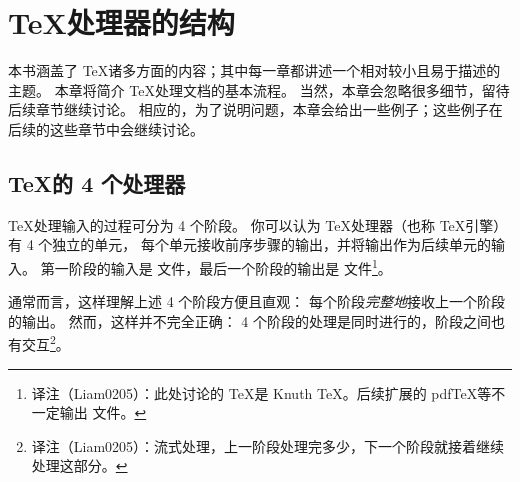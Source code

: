 \documentclass{book}
\begin{document}
\chapter{\TeX 处理器的结构}

本书涵盖了 \TeX 诸多方面的内容；其中每一章都讲述一个相对较小且易于描述的主题。
本章将简介 \TeX 处理文档的基本流程。
当然，本章会忽略很多细节，留待后续章节继续讨论。
相应的，为了说明问题，本章会给出一些例子；这些例子在后续的这些章节中会继续讨论。

\section{\TeX 的 4 个处理器}

\TeX 处理输入的过程可分为 4 个阶段。
你可以认为 \TeX 处理器（也称 \TeX 引擎）有 4 个独立的单元，
每个单元接收前序步骤的输出，并将输出作为后续单元的输入。
第一阶段的输入是  文件，最后一个阶段的输出是  文件\footnote{译注（Liam0205）：此处讨论的 \TeX 是 Knuth \TeX。后续扩展的 pdf\TeX 等不一定输出  文件。}。%

通常而言，这样理解上述 4 个阶段方便且直观：
每个阶段\emph{完整地}接收上一个阶段的输出。
然而，这样并不完全正确：
4 个阶段的处理是同时进行的，阶段之间也有交互\footnote{译注（Liam0205）：流式处理，上一阶段处理完多少，下一个阶段就接着继续处理这部分。}。
\end{document}

